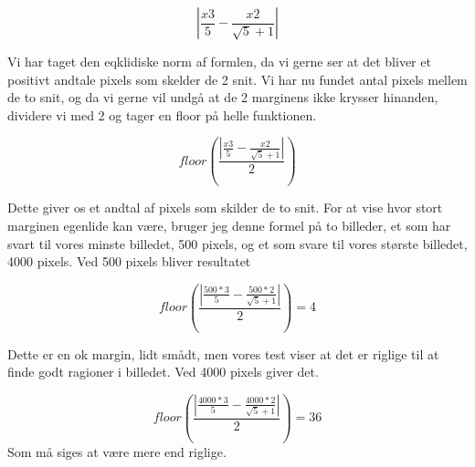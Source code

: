 \begin{equation}
	|\frac{x3}{5} - \frac{x2}{\sqrt{5}+1}| 
\end{equation}

Vi har taget den eqklidiske norm af formlen, da vi gerne ser at det
bliver et positivt andtale pixels som skelder de 2 snit. Vi har nu
fundet antal pixels mellem de to snit, og da vi gerne vil undgå at de 2
marginens ikke krysser hinanden, dividere vi med 2 og tager en floor på
helle funktionen.

\begin{equation}
	floor(\frac{|\frac{x3}{5} - \frac{x2}{\sqrt{5}+1}| }{2})
\end{equation}

Dette giver os et andtal af pixels som skilder de to snit. For at vise
hvor stort marginen egenlide kan være, bruger jeg denne formel på to
billeder, et som har svart til vores minste billedet, 500 pixels, og et
som svare til vores største billedet, 4000 pixels. Ved 500 pixels
bliver resultatet

\begin{equation}
	floor(\frac{|\frac{500*3}{5} - \frac{500*2}{\sqrt{5}+1}| }{2}) = 4
\end{equation}

Dette er en ok margin, lidt smådt, men vores test viser at det er
riglige til at finde godt ragioner i billedet.
Ved 4000 pixels giver det.

\begin{equation}
	floor(\frac{|\frac{4000*3}{5} - \frac{4000*2}{\sqrt{5}+1}| }{2}) = 36
\end{equation}
Som må siges at være mere end riglige.
